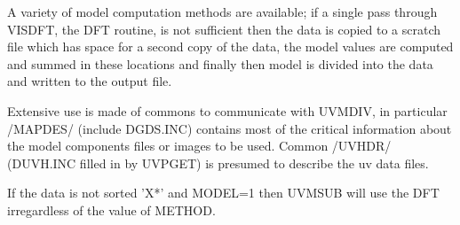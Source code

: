    A variety of model computation methods are available; if a single
pass through VISDFT, the DFT routine, is not sufficient then the data
is copied to a scratch file which has space for a second copy of the
data, the model values are computed and summed in these locations
and finally then model is divided into the data and written to the
output file.

   Extensive use is made of commons to communicate with UVMDIV, in
particular /MAPDES/ (include DGDS.INC) contains most
of the critical information about the model components files or
images to be used.  Common /UVHDR/ (DUVH.INC filled in by UVPGET) is
presumed to describe the uv data files.

   If the data is not sorted 'X*' and MODEL=1 then UVMSUB will use
the DFT irregardless of the value of METHOD.

